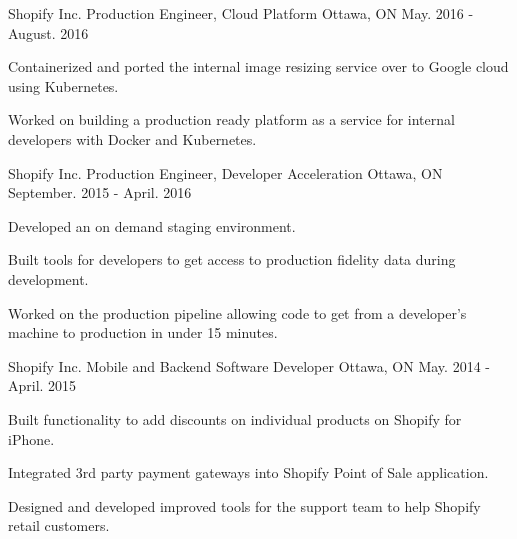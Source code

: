 

\begin{cventries}

  \cventry
    {Shopify Inc.} %
    {Production Engineer, Cloud Platform} %
    {Ottawa, ON} %
    {May. 2016 - August. 2016} %
    {
      \begin{cvitems} %
        \item {Containerized and ported the internal image resizing service over to Google cloud using Kubernetes.}
        \item {Worked on building a production ready platform as a service for internal developers with Docker and Kubernetes.}
      \end{cvitems}
    }
    
  \cventry
    {Shopify Inc.} %
    {Production Engineer, Developer Acceleration} %
    {Ottawa, ON} %
    {September. 2015 - April. 2016} %
    {
      \begin{cvitems} %
        \item {Developed an on demand staging environment.}
        \item {Built tools for developers to get access to production fidelity data during development.}
        \item {Worked on the production pipeline allowing code to get from a developer's machine to production in under 15 minutes.}
      \end{cvitems}
    }

  \cventry
    {Shopify Inc.} %
    {Mobile and Backend Software Developer} %
    {Ottawa, ON} %
    {May. 2014 - April. 2015} %
    {
      \begin{cvitems} %
        \item {Built functionality to add discounts on individual products on Shopify for iPhone.}
        \item {Integrated 3rd party payment gateways into Shopify Point of Sale application.}
        \item {Designed and developed improved tools for the support team to help Shopify retail customers.}
      \end{cvitems}
    } 
    

\end{cventries}
